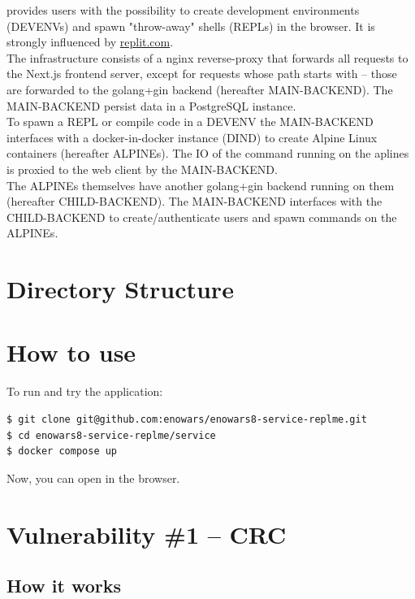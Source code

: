\documentclass[10pt]{article}
\begin{document}
 provides users with the possibility to create development environments (DEVENVs) and spawn "throw-away" shells (REPLs) in the browser. It is strongly influenced by \href{https://replit.com}{replit.com}. \\

The infrastructure consists of a nginx reverse-proxy that forwards all requests to the Next.js frontend server, except for requests whose path starts with  -- those are forwarded to the golang+gin backend (hereafter MAIN-BACKEND). The MAIN-BACKEND persist data in a PostgreSQL instance. \\

To spawn a REPL or compile code in a DEVENV the MAIN-BACKEND interfaces with a docker-in-docker instance (DIND) to create Alpine Linux containers (hereafter ALPINEs). The IO of the command running on the aplines is proxied to the web client by the MAIN-BACKEND. \\

The ALPINEs themselves have another golang+gin backend running on them (hereafter CHILD-BACKEND). The MAIN-BACKEND interfaces with the CHILD-BACKEND to create/authenticate users and spawn commands on the ALPINEs.

\section{Directory Structure}



\section{How to use}

To run and try the application:
\begin{lstlisting}
$ git clone git@github.com:enowars/enowars8-service-replme.git
$ cd enowars8-service-replme/service
$ docker compose up
\end{lstlisting}

Now, you can open  in the browser.

\section{Vulnerability \#1 -- CRC}

\subsection{How it works}
\end{document}
